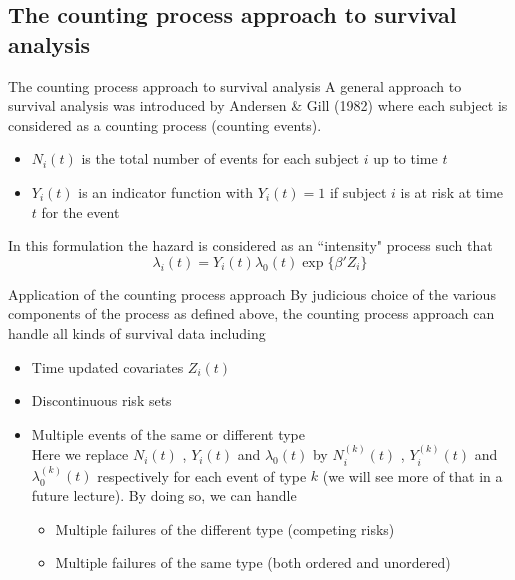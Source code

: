 \documentclass[envcountsect, 10pt, portrait, palatino]{beamer}
\begin{document}
\subsection{The counting process approach to survival analysis}
\begin{frame}{The counting process approach to survival analysis}
A general approach to survival analysis was introduced by Andersen \& Gill (1982) where each subject is considered as a counting process (counting events).
\begin{itemize}
\item $N_i(t)$ is the total number of events for each subject $i$ up to time $t$
\item $Y_i(t)$ is an indicator function with $Y_{i}(t)=1$ if subject $i$ is at risk at time $t$ for the event
\end{itemize}
In this formulation the hazard is considered as an ``intensity" process such that
$$
\lambda_i(t)=Y_i(t)\lambda_0(t)\exp\{\beta'Z_i\}
$$
\end{frame}
\begin{frame}{Application of the counting process approach}
By judicious choice of the various components of the process as defined above, the counting process approach can handle all kinds of survival data including
\begin{itemize}
\item Time updated covariates $Z_i(t)$
\item Discontinuous risk sets
\item Multiple events of the same or different type\\
Here we replace $N_i(t)$ , $Y_i(t)$ and $\lambda_0(t)$ by $N^{(k)}_i(t)$ , $Y^{(k)}_i(t)$ and $\lambda^{(k)}_0(t)$ 
respectively for each event of type $k$ (we will see more of that in a future lecture).  By doing so, we can handle
\begin{itemize}
\item Multiple failures of the different type (competing risks)
\item Multiple failures of the same type (both ordered and unordered)
\end{itemize}
\end{itemize}
\end{frame}
\end{document}

